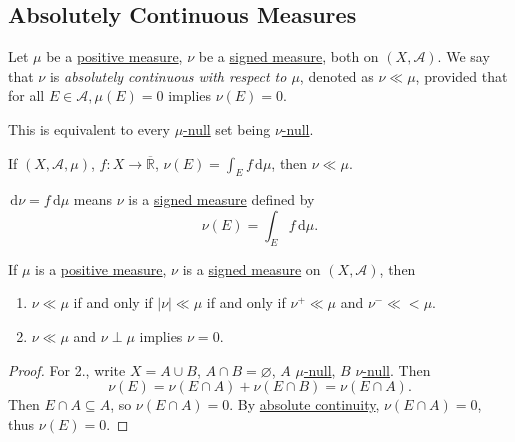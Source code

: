 \subsection{Absolutely Continuous Measures}
\begin{definition}\label{def:absolutely-continuous}
	Let \(\mu\) be a \hyperref[def:signed-measure]{positive measure}, \(\nu\) be a \hyperref[def:signed-measure]{signed measure}, both on \((X, \mathcal{A})\). We say that \(\nu\) is
	\emph{absolutely continuous with respect to \(\mu\)}, denoted as \(\nu \ll \mu\), provided that for all \(E \in \mathcal{A}, \mu(E) = 0\) implies \(\nu(E) = 0\).
\end{definition}
\begin{remark}
	This is equivalent to every \hyperref[def:null-set-for-a-signed-measure]{\(\mu\)-null} set being \hyperref[def:null-set-for-a-signed-measure]{\(\nu\)-null}.
\end{remark}
\begin{eg}
	If \((X ,\mathcal{A}, \mu)\), \(f \colon X \to \overline{\mathbb{R}}\), \(\nu(E) = \int_E f \,\mathrm{d} \mu\), then \(\nu \ll \mu\).
\end{eg}

\begin{notation}
	\(\,\mathrm{d} \nu = f \,\mathrm{d} \mu\) means \(\nu\) is a \hyperref[def:signed-measure]{signed measure} defined by
	\[
		\nu(E) = \int_E f \,\mathrm{d} \mu.
	\]
\end{notation}

\begin{lemma}
	If \(\mu\) is a \hyperref[def:signed-measure]{positive measure}, \(\nu\) is a \hyperref[def:signed-measure]{signed measure} on \((X, \mathcal{A})\), then
	\begin{enumerate}
		\item \(\nu \ll \mu\) if and only if \(\left\vert \nu \right\vert \ll \mu\) if and only if \(\nu^+ \ll \mu\) and \(\nu^- \ll< \mu\).
		\item \(\nu \ll \mu\) and \(\nu \perp \mu\) implies \(\nu = 0\).
	\end{enumerate}
\end{lemma}

\begin{proof}

	For 2., write \(X = A \cup B\), \(A \cap B = \varnothing\), \(A\) \hyperref[def:null-set-for-a-signed-measure]{\(\mu\)-null}, \(B\) \hyperref[def:null-set-for-a-signed-measure]{\(\nu\)-null}.
	Then
	\[
		\nu(E) = \nu(E \cap A) + \nu(E \cap B) = \nu(E \cap A).
	\]
	Then \(E \cap A \subseteq A\), so \(\nu(E \cap A) = 0\). By \hyperref[def:absolutely-continuous]{absolute continuity}, \(\nu(E \cap A) = 0\), thus \(\nu(E) = 0\).
\end{proof}

